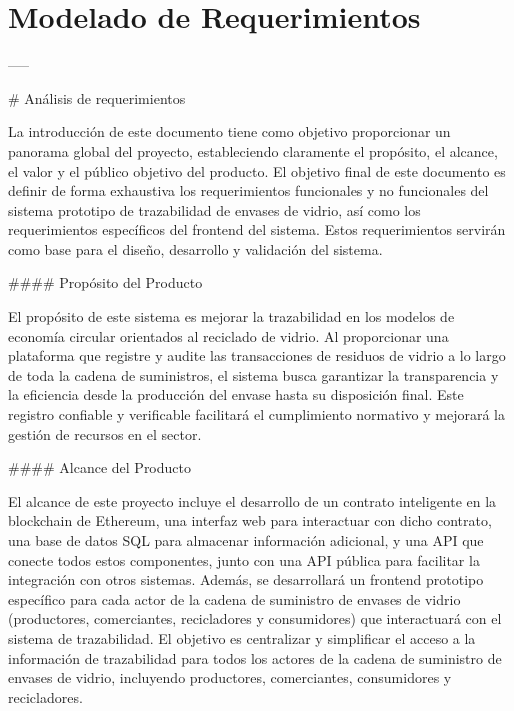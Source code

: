 \chapter[Modelado de Requerimientos]{Modelado de Requerimientos}
\label{cp:modelling}

\parindent0pt


-----

# Análisis de requerimientos

La introducción de este documento tiene como objetivo proporcionar un panorama global del proyecto, estableciendo claramente el propósito, el alcance, el valor y el público objetivo del producto. El objetivo final de este documento es definir de forma exhaustiva los requerimientos funcionales y no funcionales del sistema prototipo de trazabilidad de envases de vidrio, así como los requerimientos específicos del frontend del sistema. Estos requerimientos servirán como base para el diseño, desarrollo y validación del sistema.

#### Propósito del Producto

El propósito de este sistema es mejorar la trazabilidad en los modelos de economía circular orientados al reciclado de vidrio. Al proporcionar una plataforma que registre y audite las transacciones de residuos de vidrio a lo largo de toda la cadena de suministros, el sistema busca garantizar la transparencia y la eficiencia desde la producción del envase hasta su disposición final. Este registro confiable y verificable facilitará el cumplimiento normativo y mejorará la gestión de recursos en el sector.

#### Alcance del Producto

El alcance de este proyecto incluye el desarrollo de un contrato inteligente en la blockchain de Ethereum, una interfaz web para interactuar con dicho contrato, una base de datos SQL para almacenar información adicional, y una API que conecte todos estos componentes, junto con una API pública para facilitar la integración con otros sistemas. Además, se desarrollará un frontend prototipo específico para cada actor de la cadena de suministro de envases de vidrio (productores, comerciantes, recicladores y consumidores) que interactuará con el sistema de trazabilidad. El objetivo es centralizar y simplificar el acceso a la información de trazabilidad para todos los actores de la cadena de suministro de envases de vidrio, incluyendo productores, comerciantes, consumidores y recicladores.

